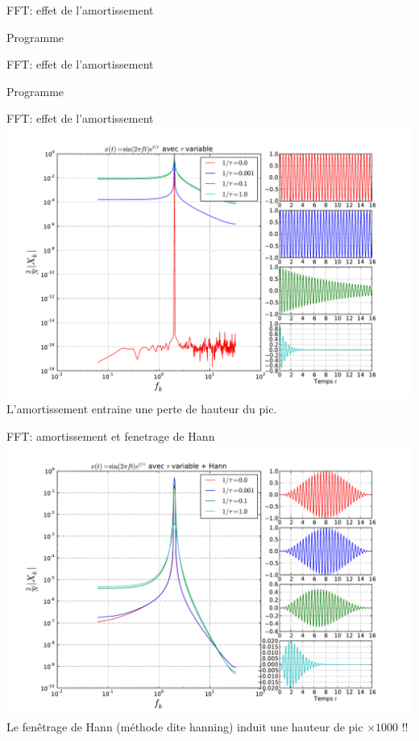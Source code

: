 \documentclass[8pt,a4paper]{beamer}
\begin{document}
\begin{frame}{FFT: effet de l'amortissement}
\begin{block}{Programme}

\end{block}
\end{frame}
\begin{frame}{FFT: effet de l'amortissement}
\begin{block}{Programme}

\end{block}
\end{frame}

\begin{frame}{FFT: effet de l'amortissement}
\includegraphics[width=1.\textwidth]{figures/FFT_amortissement.pdf} \\
\alert{L'amortissement entraine une perte de hauteur du pic.}
\end{frame}

\begin{frame}{FFT: amortissement et fenetrage de Hann}
\includegraphics[width=1.\textwidth]{figures/FFT_amortissement-hann.pdf} \\
\alert{Le fenêtrage de Hann (méthode dite hanning) induit une hauteur de pic $\times 1000$ !!}
\end{frame}
\end{document}
